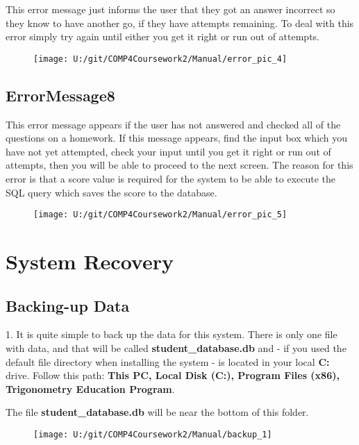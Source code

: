 This error message just informs the user that they got an answer incorrect so they know to have another go, if they have attempts remaining. To deal with this error simply try again until either you get it right or run out of attempts.

\begin{figure}[H]
    \texttt{[image: U:/git/COMP4Coursework2/Manual/error\_pic\_4]}
\end{figure}

\subsection{ErrorMessage8}

This error message appears if the user has not answered and checked all of the questions on a homework. If this message appears, find the input box which you have not yet attempted, check your input until you get it right or run out of attempts, then you will be able to proceed to the next screen. The reason for this error is that a score value is required for the system to be able to execute the SQL query which saves the score to the database.

\begin{figure}[H]
    \texttt{[image: U:/git/COMP4Coursework2/Manual/error\_pic\_5]}
\end{figure}

\section{System Recovery}

\subsection{Backing-up Data}

1. It is quite simple to back up the data for this system. There is only one file with data, and that will be called \textbf{student\_database.db} and - if you used the default file directory when installing the system - is located in your local \textbf{C:} drive. Follow this path: \textbf{This PC, Local Disk (C:), Program Files (x86), Trigonometry Education Program}.

The file \textbf{student\_database.db} will be near the bottom of this folder.

\begin{figure}[H]
    \texttt{[image: U:/git/COMP4Coursework2/Manual/backup\_1]}
\end{figure}

